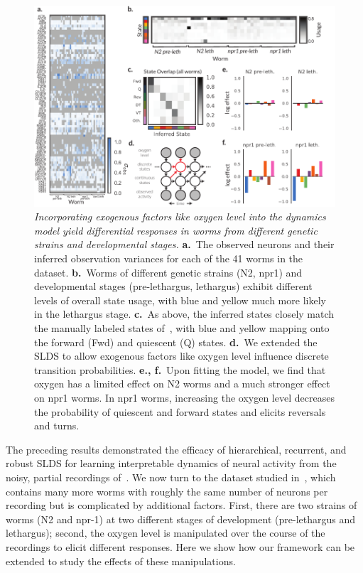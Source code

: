 \documentclass[11pt]{article}
\begin{document}
\begin{figure}[t!]
\centering
\includegraphics[width=6in]{figures/figure5} 
\caption{\textit{Incorporating exogenous factors like oxygen level
    into the dynamics model yield differential responses in worms from
    different genetic strains and developmental stages.}
  \textbf{a.}~The observed neurons and their inferred observation variances
  for each of the 41 worms in the~\citet{nichols2017global} dataset.
  \textbf{b.}~Worms of different genetic strains (N2, npr1) and developmental
  stages (pre-lethargus, lethargus) exhibit different levels of overall
  state usage, with blue and yellow much more likely in the lethargus stage.
  \textbf{c.}~As above, the inferred states closely match the manually
  labeled states of~\citet{nichols2017global}, with blue and yellow mapping
  onto the forward (\textsf{Fwd}) and quiescent (\textsf{Q}) states.
  \textbf{d.}~We extended the SLDS to allow exogenous factors like oxygen
  level influence discrete transition probabilities.
  \textbf{e., f.}~Upon fitting the model, we find that oxygen has a limited
  effect on N2 worms and a much stronger effect on npr1 worms. In npr1 worms,
  increasing the oxygen level decreases the probability of quiescent and
  forward states and elicits reversals and turns.
}
\label{fig:o2}
\end{figure}

The preceding results demonstrated the efficacy of hierarchical,
recurrent, and robust SLDS for learning interpretable dynamics of
neural activity from the noisy, partial recordings
of~\citet{kato2015global}.  We now turn to the dataset studied
in~\citet{nichols2017global}, which contains many more worms with
roughly the same number of neurons per recording but is complicated by
additional factors.  First, there are two strains of worms (N2 and
npr-1) at two different stages of development (pre-lethargus and
lethargus); second, the oxygen level is manipulated over the course of
the recordings to elicit different responses.  Here we show how our
framework can be extended to study the effects of these manipulations.
\end{document}
